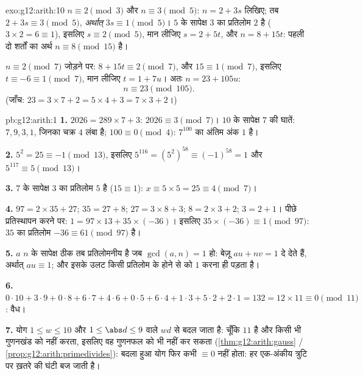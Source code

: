 \begin{solution}{exo:g12:arith:10}
$n \equiv 2 \pmod 3$ और $n \equiv 3 \pmod 5$: $n = 2 + 3s$ लिखिए; तब $2 + 3s \equiv 3 \pmod 5$, \emph{अर्थात्} $3s \equiv 1 \pmod 5$। $5$ के सापेक्ष
$3$ का प्रतिलोम $2$ है ($3\times2 = 6 \equiv 1$), इसलिए $s \equiv 2 \pmod 5$, मान लीजिए $s = 2 + 5t$, और $n = 8 + 15t$:
पहली दो शर्तों का अर्थ $n \equiv 8 \pmod{15}$ है।

$n \equiv 2 \pmod 7$ जोड़ने पर: $8 + 15t \equiv 2 \pmod 7$, और $15 \equiv 1 \pmod 7$, इसलिए $t \equiv -6 \equiv 1 \pmod 7$, मान लीजिए $t = 1 + 7u$। अतः $n = 23 + 105u$:
\[
n \equiv 23 \pmod{105}.
\]
(जाँच: $23 = 3\times7 + 2 = 5\times4 + 3 = 7\times3 + 2$।)
\end{solution}

\begin{solution}{pb:g12:arith:1}
\textbf{1.} $2026 = 289 \times 7 + 3$: $2026 \equiv 3
\pmod 7$। $10$ के सापेक्ष $7$ की घातें: $7, 9, 3, 1$, जिनका चक्र
$4$ लंबा है; $100 \equiv 0 \pmod 4$: $7^{100}$ का अंतिम अंक $1$ है।

\textbf{2.} $5^2 = 25 \equiv -1 \pmod{13}$, इसलिए $5^{116} = \left(5^2\right)^{58} \equiv (-1)^{58} = 1$ और $5^{117} \equiv 5 \pmod{13}$।

\textbf{3.} $7$ के सापेक्ष $3$ का प्रतिलोम $5$ है ($15 \equiv 1$): $x \equiv 5 \times 5 = 25 \equiv 4 \pmod 7$।

\textbf{4.} $97 = 2 \times 35 + 27$; $35 = 27 + 8$; $27 = 3 \times 8 + 3$; $8 = 2 \times 3 + 2$; $3 = 2 + 1$। पीछे प्रतिस्थापन करने पर:
$1 = 97 \times 13 + 35 \times (-36)$। इसलिए $35 \times (-36) \equiv 1 \pmod{97}$: $35$ का प्रतिलोम $-36 \equiv 61 \pmod{97}$ है।

\textbf{5.} $a$ $n$ के सापेक्ष ठीक तब प्रतिलोमनीय है जब $\gcd(a, n) = 1$ हो: बेज़ू
$au + nv = 1$ दे देते हैं, अर्थात् $au \equiv 1$; और इसके उलट किसी प्रतिलोम के होने से  को $1$  करना ही पड़ता है।

\textbf{6.} $0{\cdot}10 + 3{\cdot}9 + 0{\cdot}8 + 6{\cdot}7 +
4{\cdot}6 + 0{\cdot}5 + 6{\cdot}4 + 1{\cdot}3 + 5{\cdot}2 +
2{\cdot}1 = 132 = 12 \times 11 \equiv 0 \pmod{11}$: वैध।

\textbf{7.} योग $1 \leq w \leq 10$ और $1 \leq \abs d \leq 9$ वाले $wd$ से बदल जाता है: चूँकि $11$ 
है और किसी भी गुणनखंड को  नहीं करता, इसलिए वह गुणनफल को भी  नहीं
कर सकता (\cref{thm:g12:arith:gauss} / \cref{prop:g12:arith:primedivides}): बदला हुआ योग फिर कभी $\equiv 0$ नहीं होता: हर एक-अंकीय
त्रुटि पर ख़तरे की घंटी बज जाती है।


\end{solution}

